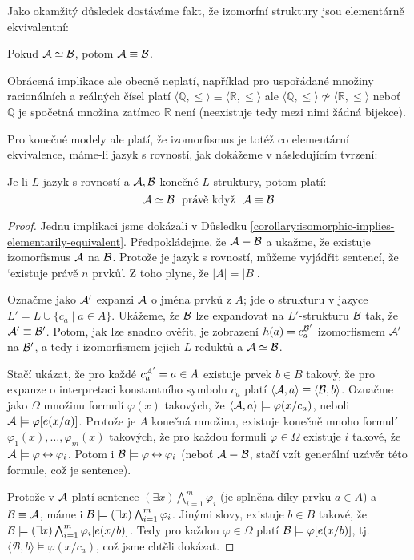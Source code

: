 Jako okamžitý důsledek dostáváme fakt, že izomorfní struktury jsou elementárně ekvivalentní:

\begin{corollary}\label{corollary:isomorphic-implies-elementarily-equivalent}
    Pokud $\mathcal{A}\simeq\mathcal{B}$, potom $\mathcal{A}\equiv\mathcal{B}$.
\end{corollary}

\begin{remark}
    Obrácená implikace ale obecně neplatí, například pro uspořádané množiny racionálních a reálných čísel platí $\langle\mathbb Q,\leq \rangle\equiv\langle\mathbb R,\leq\rangle$ ale $\langle\mathbb Q,\leq \rangle\not\simeq \langle \mathbb R,\leq\rangle$ neboť $\mathbb Q$ je spočetná množina zatímco $\mathbb R$ není (neexistuje tedy mezi nimi žádná bijekce).
\end{remark}

Pro konečné modely ale platí, že izomorfismus je totéž co elementární ekvivalence, máme-li jazyk s rovností, jak dokážeme v následujícím tvrzení:

\begin{proposition}
    Je-li $L$ jazyk s rovností a $\mathcal{A},\mathcal{B}$ konečné $L$-struktury, potom platí:
    $$
    \mathcal{A}\simeq\mathcal{B}\ \text{ právě když }\ \mathcal{A}\equiv\mathcal{B}
    $$
\end{proposition}
\begin{proof}
    Jednu implikaci jsme dokázali v Důsledku \ref{corollary:isomorphic-implies-elementarily-equivalent}. Předpokládejme, že $\mathcal{A}\equiv\mathcal{B}$ a ukažme, že existuje izomorfismus $\mathcal{A}$ na $\mathcal{B}$. Protože je jazyk s rovností, můžeme vyjádřit sentencí, že `existuje právě $n$ prvků'. Z toho plyne, že $|A|=|B|$.

    Označme jako $\mathcal{A}'$ expanzi $\mathcal{A}$ o jména prvků z $A$; jde o strukturu v jazyce $L'=L\cup\{c_a\mid a\in A\}$. Ukážeme, že $\mathcal{B}$ lze expandovat na $L'$-strukturu $\mathcal{B}$ tak, že $\mathcal{A}'\equiv \mathcal{B}'$. Potom, jak lze snadno ověřit, je zobrazení $h(a)= c_a^{\mathcal{B}'}$ izomorfismem $\mathcal{A}'$ na $\mathcal{B}'$, a tedy i izomorfismem jejich $L$-reduktů a $\mathcal{A}\simeq\mathcal{B}$.

    Stačí ukázat, že pro každé $c_a^{\mathcal{A}'}=a\in A$ existuje prvek $b\in B$ takový, že pro expanze o interpretaci konstantního symbolu $c_a$ platí $\langle  \mathcal{A},a\rangle\equiv\langle\mathcal{B},b\rangle$. Označme jako $\Omega$ množinu formulí $\varphi(x)$ takových, že $\langle \mathcal{A},a\rangle \models \varphi(x/c_a)$, neboli $\mathcal{A}\models \varphi[e(x/a)]$. Protože je $A$ konečná množina, existuje konečně mnoho formulí $\varphi_1(x),\dots,\varphi_m(x)$ takových, že pro každou formuli $\varphi \in \Omega$ existuje $i$ takové, že $\mathcal{A}\models \varphi\mathbin{\leftrightarrow}\varphi_i$. Potom i $\mathcal{B}\models\varphi\mathbin{\leftrightarrow}\varphi_i$ (neboť $\mathcal{A}\equiv\mathcal{B}$, stačí vzít generální uzávěr této formule, což je sentence).
    
    Protože v $\mathcal{A}$ platí sentence $(\exists x)\bigwedge_{i=1}^m\varphi_i$ (je splněna díky prvku $a\in A$) a $\mathcal{B}\equiv\mathcal{A}$, máme i $\mathcal{B}\models (\exists x)\bigwedge_{i=1}^m\varphi_i$. Jinými slovy, existuje $b\in B$ takové, že $\mathcal{B}\models (\exists x)\bigwedge_{i=1}^m\varphi_i[e(x/b)]$. Tedy pro každou $\varphi\in \Omega$ platí $\mathcal{B}\models \varphi[e(x/b)]$, tj. $\langle\mathcal{B},b\rangle\models \varphi(x/c_a)$, což jsme chtěli dokázat.
\end{proof}

